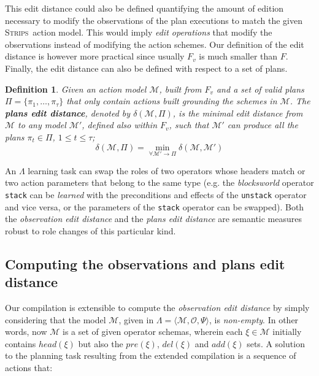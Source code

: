 \documentclass[3p,times]{elsarticle}
\newtheorem{mydefinition}[mytheorem]{Definition}
\newcommand{\strips}{\textsc{Strips}}     %
\newcommand{\tup}[1]{{\langle #1 \rangle}}
\begin{document}
This edit distance could also be defined quantifying the amount of edition necessary to modify the observations of the plan executions to match the given \strips\ action model. This would imply {\em edit operations} that modify the observations instead of modifying the action schemes. Our definition of the edit distance is however more practical since usually $F_v$ is much smaller than $F$. Finally, the edit distance can also be defined with respect to a set of plans. 

\begin{mydefinition}
  Given an action model $\mathcal{M}$, built from $F_v$ and a set of valid plans $\Pi=\{\pi_1,\ldots,\pi_{\tau}\}$ that only contain actions built grounding the schemes in $\mathcal{M}$. The {\bf plans edit distance}, denoted by  $\delta(\mathcal{M},\Pi)$, is the minimal edit distance from $\mathcal{M}$ to any model $\mathcal{M}'$, defined also within $F_v$, such that $\mathcal{M}'$ can produce all the plans $\pi_t\in \Pi$, {\tt\small $1\leq t\leq \tau$}; \[\delta(\mathcal{M},\Pi)=\min_{\forall \mathcal{M}' \rightarrow \Pi} \delta(\mathcal{M},\mathcal{M}')\]
\end{mydefinition}

An $\Lambda$ learning task can swap the roles of two operators whose headers match or two action parameters that belong to the same type (e.g. the {\em blocksworld} operator {\small\tt stack} can be {\em learned} with the preconditions and effects of the {\small\tt unstack} operator and vice versa, or the parameters of the {\small\tt stack} operator can be swapped). Both the {\em observation edit distance} and the {\em plans edit distance} are semantic measures robust to role changes of this particular kind.



\subsection{Computing the observations and plans edit distance}
Our compilation is extensible to compute the {\em observation edit distance} by simply considering that the model $\mathcal{M}$, given in $\Lambda=\tup{\mathcal{M},\mathcal{O},\Psi}$, is {\em non-empty}. In other words, now $\mathcal{M}$ is a set of given operator schemas, wherein each $\xi\in\mathcal{M}$ initially contains $head(\xi)$ but also the $pre(\xi)$, $del(\xi)$ and $add(\xi)$ sets. A solution to the planning task resulting from the extended compilation is a sequence of actions that:
\end{document}
